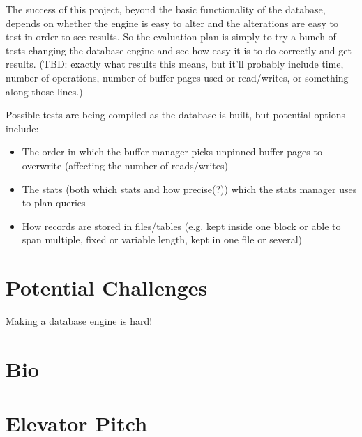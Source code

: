 \documentclass[12pt, oneside]{amsart} %
\begin{document}
The success of this project, beyond the basic functionality of the database, depends on whether the engine is easy to alter and the alterations are easy to test in order to see results. So the evaluation plan is simply to try a bunch of tests changing the database engine and see how easy it is to do correctly and get results. (TBD: exactly what results this means, but it'll probably include time, number of operations, number of buffer pages used or read/writes, or something along those lines.) 

Possible tests are being compiled as the database is built, but potential options include: 
\begin{itemize}
    \item The order in which the buffer manager picks unpinned buffer pages to overwrite (affecting the number of reads/writes)
    \item The stats (both which stats and how precise(?)) which the stats manager uses to plan queries
    \item How records are stored in files/tables (e.g. kept inside one block or able to span multiple, fixed or variable length, kept in one file or several)
\end{itemize}


\section{Potential Challenges}

Making a database engine is hard! 

\section{Bio}

\section{Elevator Pitch}
\end{document}
